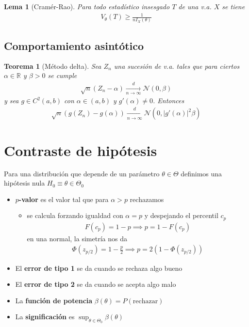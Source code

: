 \documentclass[a4paper,twocolumn]{extarticle}
\newtheorem*{thm}{Teorema}
\newtheorem*{lem}{Lema}
\theoremstyle{remark}
\newcommand{\R}{\mathbb{R}}
\newcommand{\normal}{\mathcal{N}}
\begin{document}
\begin{lem}[Cramér-Rao]
	Para todo estadístico insesgado $T$ de una v.a. $X$ se tiene
	\begin{align*}
		V_\theta(T) \geq \frac{1}{nI_X(\theta)}
	\end{align*}
\end{lem}

\subsection{Comportamiento asintótico}

\begin{thm}[Método delta]
	Sea $Z_n$ una sucesión de v.a. tales que para ciertos $\alpha \in \R$ y  $\beta > 0$ se cumple
	\begin{align*}
		\sqrt{n}(Z_n - \alpha)\xrightarrow[n \to \infty]{d} \normal(0, \beta)
	\end{align*}
	y sea $g \in C^2(a,b)$ con $\alpha \in (a,b)$ y $g'(\alpha) \neq 0$. Entonces
	\begin{align*}
		\sqrt{n}(g(Z_n) - g(\alpha)) \xrightarrow[n \to \infty]{d} \normal(0, |g'(\alpha)|^2\beta)
	\end{align*}
\end{thm}

\section{Contraste de hipótesis}

Para una distribución que depende de un parámetro $\theta \in \Theta$ definimos una hipótesis nula $H_0 \equiv \theta \in \Theta_0$

\begin{itemize}
	\item $p$\textbf{-valor} es el valor tal que para $\alpha > p$ rechazamos
	\begin{itemize}
		\item se calcula forzando igualdad con $\alpha = p$ y despejando el percentil $c_p$
		\begin{align*}
		F(c_p) = 1 - p \implies p = 1 - F(c_p)
		\end{align*}
		en una normal, la simetría nos da
		\begin{align*}
			\Phi(z_{p/2}) = 1 - \frac{p}{2} \implies p = 2(1 - \Phi(z_{p/2}))
		\end{align*}
	\end{itemize}
	\item El \textbf{error de tipo 1} se da cuando se rechaza algo bueno
	\item El \textbf{error de tipo 2} se da cuando se acepta algo malo
	\item La \textbf{función de potencia} $\beta(\theta) = P(\text{rechazar})$
	\item La \textbf{significación} es $\sup_{\theta \in \Theta_0} \beta(\theta)$
\end{itemize}
\end{document}
